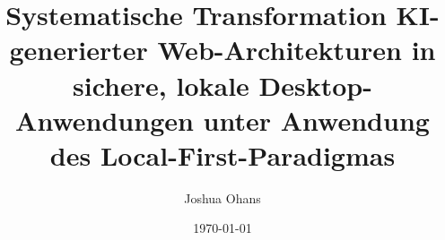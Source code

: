 \documentclass[
    ieee, %
    bachelor, %
    german, %
    singlepage %
]{ohm}
\title{Systematische Transformation KI-generierter Web-Architekturen in sichere, lokale Desktop-Anwendungen unter Anwendung des Local-First-Paradigmas}
\author{Joshua Ohans}
\date{\today}
\begin{document}
\maketitle
\makeacknowledgements
\makeabstract
\maketableofcontents
\makeacronyms








\listoffigures
\listoflistings
\listoftables
\makelexicon
\makebibliography
\appendix

\end{document}
